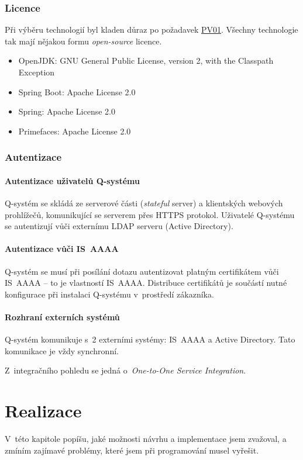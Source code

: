 \documentclass[thesis=M,czech]{FITthesis}[2019/12/23]
\begin{document}
\subsection{Licence}
Při výběru technologií byl kladen důraz po požadavek \hyperref[NefunkcniPozadavky]{PV01}. Všechny technologie tak mají nějakou formu \textit{open-source} licence. \cite{OpenSourceLicence}
\begin{itemize}
	\item OpenJDK: GNU General Public License, version 2, with the Classpath Exception
	\item Spring Boot: Apache License 2.0
	\item Spring: Apache License 2.0
	\item Primefaces: Apache License 2.0
\end{itemize}

\subsection{Autentizace}
\subsubsection{Autentizace uživatelů Q-systému}
Q-systém se skládá ze serverové části (\textit{stateful} server) a klientských webových prohlížečů, komunikující se serverem přes HTTPS protokol. Uživatelé Q-systému se autentizují vůči externímu LDAP serveru (Active Directory).

\subsubsection{Autentizace vůči IS~AAAA}
Q-systém se musí při posílání dotazu autentizovat platným certifikátem vůči IS~AAAA -- to je vlastností IS~AAAA. Distribuce certifikátů je součástí nutné konfigurace při instalaci Q-systému v~prostředí zákazníka.

\subsubsection{Rozhraní externích systémů}
Q-systém komunikuje s~2 externími systémy: IS~AAAA a Active Directory. Tato komunikace je vždy synchronní.

Z~integračního pohledu se jedná o~\textit{One-to-One Service Integration}.

\chapter{Realizace}
\label{Realizace}
V~této kapitole popíšu, jaké možnosti návrhu a implementace jsem zvažoval, a zmíním zajímavé problémy, které jsem při programování musel vyřešit.
\end{document}
